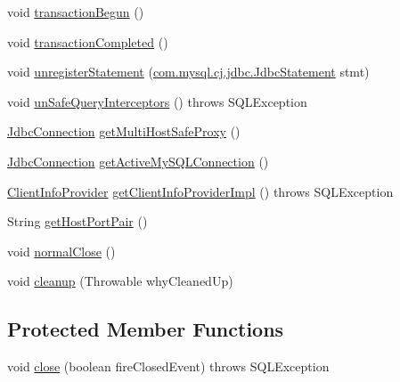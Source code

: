 \begin{DoxyCompactItemize}
$$\item 
void \mbox{\hyperlink{classcom_1_1mysql_1_1cj_1_1jdbc_1_1_connection_wrapper_af1db22509d166c6582f945352746e166}{transaction\+Begun}} ()
\item 
void \mbox{\hyperlink{classcom_1_1mysql_1_1cj_1_1jdbc_1_1_connection_wrapper_a88a3cbba3f3812a1a2023075e8ecfc36}{transaction\+Completed}} ()
\item 
void \mbox{\hyperlink{classcom_1_1mysql_1_1cj_1_1jdbc_1_1_connection_wrapper_a9a858e59cd764a87a74f9e4d5b28dad9}{unregister\+Statement}} (\mbox{\hyperlink{interfacecom_1_1mysql_1_1cj_1_1jdbc_1_1_jdbc_statement}{com.\+mysql.\+cj.\+jdbc.\+Jdbc\+Statement}} stmt)
\item 
void \mbox{\hyperlink{classcom_1_1mysql_1_1cj_1_1jdbc_1_1_connection_wrapper_a2036611c5bf77d053db017e8a991bcc0}{un\+Safe\+Query\+Interceptors}} ()  throws S\+Q\+L\+Exception 
\item 
\mbox{\hyperlink{interfacecom_1_1mysql_1_1cj_1_1jdbc_1_1_jdbc_connection}{Jdbc\+Connection}} \mbox{\hyperlink{classcom_1_1mysql_1_1cj_1_1jdbc_1_1_connection_wrapper_a8418604a5879f2fd4e820fe438ff0c5a}{get\+Multi\+Host\+Safe\+Proxy}} ()
\item 
\mbox{\hyperlink{interfacecom_1_1mysql_1_1cj_1_1jdbc_1_1_jdbc_connection}{Jdbc\+Connection}} \mbox{\hyperlink{classcom_1_1mysql_1_1cj_1_1jdbc_1_1_connection_wrapper_acc869cfc6c1bc921c9c1d46b4cd261b4}{get\+Active\+My\+S\+Q\+L\+Connection}} ()
\item 
\mbox{\hyperlink{interfacecom_1_1mysql_1_1cj_1_1jdbc_1_1_client_info_provider}{Client\+Info\+Provider}} \mbox{\hyperlink{classcom_1_1mysql_1_1cj_1_1jdbc_1_1_connection_wrapper_ade0b119a9d79e5bf3433ad6e843b9f0a}{get\+Client\+Info\+Provider\+Impl}} ()  throws S\+Q\+L\+Exception 
\item 
String \mbox{\hyperlink{classcom_1_1mysql_1_1cj_1_1jdbc_1_1_connection_wrapper_a02892a193f92d8dcb540752cadd07a49}{get\+Host\+Port\+Pair}} ()
\item 
void \mbox{\hyperlink{classcom_1_1mysql_1_1cj_1_1jdbc_1_1_connection_wrapper_a7fdf5a3f3e8efeaefc0a51ed69309416}{normal\+Close}} ()
\item 
void \mbox{\hyperlink{classcom_1_1mysql_1_1cj_1_1jdbc_1_1_connection_wrapper_ab604be7f74e54251056bc902359fa65a}{cleanup}} (Throwable why\+Cleaned\+Up)
\end{DoxyCompactItemize}
\subsection*{Protected Member Functions}
\begin{DoxyCompactItemize}
\item 
void \mbox{\hyperlink{classcom_1_1mysql_1_1cj_1_1jdbc_1_1_connection_wrapper_af395860424c66b64537c7557ebdfd6f0}{close}} (boolean fire\+Closed\+Event)  throws S\+Q\+L\+Exception 
\end{DoxyCompactItemize}
